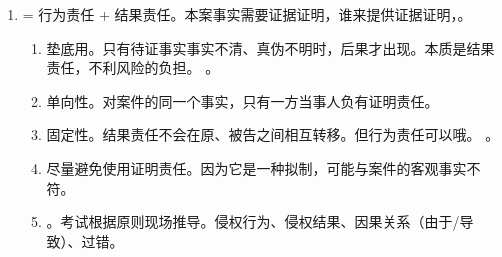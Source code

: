 \begin{enumerate}
\begin{kk}{自认。重点中的重点}
\begin{enumerate}
\begin{enumerate}
\begin{enumerate}
{                                    \yjt 借款 8W 与承认持有借条这一事实不可分割 \yjt 不一定构成自认}。\\
                                  \er\, 。
                            \item 分别认定。当事人承认的事实构成自认，将附加条件作为当事人另行主张的诉讼请求。
                                  。
                          \end{enumerate}
                  \end{enumerate}
            \item 共同诉讼中的自认。。
                  \begin{enumerate}
                    \item 普通 \yjt {}。。
                    \item 必要 \yjt {}。。
                  \end{enumerate}
            \item 撤回自认 \bdy 推翻自认。法庭辩论终结前，对方同意 + 受胁迫 \hz 重大误解。实践中撤回自认很难。
          \end{enumerate}
        \end{kk}
  \item {} = 行为责任 + 结果责任。本案事实需要证据证明，谁来提供证据证明，。
        \begin{enumerate}
          \item 垫底用。只有待证事实事实不清、真伪不明时，后果才出现。本质是结果责任，不利风险的负担。
                。
          \item 单向性。对案件的同一个事实，只有一方当事人负有证明责任。
          \item 固定性。结果责任不会在原、被告之间相互转移。但行为责任可以哦。
                。
          \item 尽量避免使用证明责任。因为它是一种拟制，可能与案件的客观事实不符。
          \item {}。考试根据原则现场推导。侵权行为、侵权结果、因果关系（由于/导致）、过错。

\end{enumerate}
\end{enumerate}
